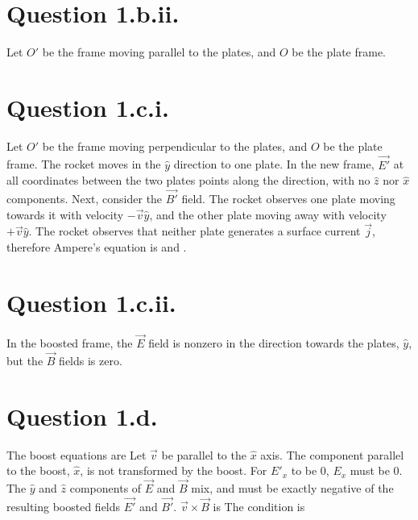 \documentclass{article}
\begin{document}
\section{Question 1.b.ii.}
Let $O'$ be the frame moving parallel to the plates, and $O$ be the plate frame.

\section{Question 1.c.i.}
Let $O'$ be the frame moving perpendicular to the plates, and $O$ be the plate frame. The rocket moves in the $\hat{y}$ direction to one plate. In the new frame, $\vec{E'}$ at all coordinates between the two plates points along the  direction, with no $\hat{z}$ nor $\hat{x}$ components. Next, consider the $\vec{B'}$ field. The rocket observes one plate moving towards it with velocity $-\vec{v}\hat{y}$, and the other plate moving away with velocity $+\vec{v}\hat{y}$. The rocket observes that neither plate generates a surface current $\vec{j}$, therefore Ampere's equation is
and .

\section{Question 1.c.ii.}
In the boosted frame, the $\vec{E}$ field is nonzero in the direction towards the plates, $\hat{y}$, but the $\vec{B}$ fields is zero.

\section{Question 1.d.}The boost equations are
Let $\vec{v}$ be parallel to the $\hat{x}$ axis. The component parallel to the boost, $\hat{x}$, is not transformed by the boost. For $E'_x$ to be 0, $E_x$ must be 0. The $\hat{y}$ and $\hat{z}$ components of $\vec{E}$ and $\vec{B}$ mix, and must be exactly negative of the resulting boosted fields $\vec{E'}$ and $\vec{B'}$. $\vec{v}\times \vec{B}$ is
The condition is
\end{document}
